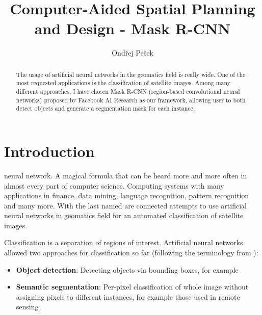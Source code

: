 \documentclass[journal, onecolumn, a4paper]{IEEEtran}
\begin{document}
\setlength{\abovedisplayskip}{0pt}

	\title{Computer-Aided Spatial Planning and Design - Mask R-CNN}
	\author{Ondřej Pešek}
	\maketitle

\begin{abstract}
The usage of artificial neural networks in the geomatics field is really wide. 
One of the most requested applications is the classification of satellite 
images. Among many different approaches, I have chosen Mask R-CNN (region-based 
convolutional neural networks) proposed by Facebook AI Research as our 
framework, allowing user to both detect objects and generate a segmentation mask 
for each instance. 

\end{abstract}

\section*{Introduction}

 neural network. A magical formula that can be heard more and more often in almost every part of computer science. Computing systems with many applications in finance, data mining, language recognition, pattern recognition and many more. With the last named are connected attempts to use artificial neural networks in geomatics field for an automated classification of satellite images. 

Classification is a separation of regions of interest. Artificial neural networks allowed two approaches for classification so far (following the terminology from \cite{mask-rcnn}):
\begin{itemize}
\item \textbf{Object detection}: Detecting objects via bounding boxes, for example \cite{objectdet}
\item \textbf{Semantic segmentation}: Per-pixel classification of whole image without assigning pixels to different instances, for example those used in remote sensing \cite{fcnn-seg}
\end{itemize}
\end{document}
